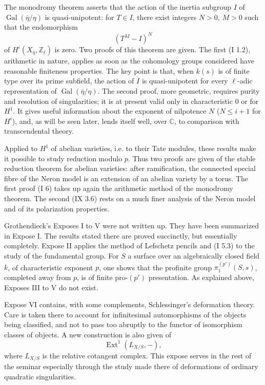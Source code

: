 \documentclass[11pt]{article}
\providecommand{\Gal}{\operatorname{Gal}}
\providecommand{\Zl}{\mathbb Z_\ell}
\begin{document}
The monodromy theorem asserts that the action of the inertia subgroup $I$ of $\Gal(\bar\eta/\eta)$ is quasi-unipotent: for $T\in I$, there exist integers $N>0$, $M>0$ such that the endomorphism
\[
 (T^M-I)^N
\]
of $H^i(X_{\bar\eta},\Zl)$ is zero. Two proofs of this theorem are given. The first (I 1.2), arithmetic in nature, applies as soon as the cohomology groups considered have reasonable finiteness properties. The key point is that, when $k(s)$ is of finite type over its prime subfield, the action of $I$ is quasi-unipotent for every $\ell$-adic representation of $\Gal(\bar\eta/\eta)$. The second proof, more geometric, requires purity and resolution of singularities; it is at present valid only in characteristic $0$ or for $H^1$. It gives useful information about the exponent of nilpotence $N$ ($N\leq i+1$ for $H^i$), and, as will be seen later, lends itself well, over $\mathbb C$, to comparison with transcendental theory.

Applied to $H^1$ of abelian varieties, i.e. to their Tate modules, these results make it possible to study reduction modulo $p$. Thus two proofs are given of the stable reduction theorem for abelian varieties: after ramification, the connected special fibre of the Neron model is an extension of an abelian variety by a torus. The first proof (I 6) takes up again the arithmetic method of the monodromy theorem. The second (IX 3.6) rests on a much finer analysis of the Neron model and of its polarization properties.

Grothendieck's Exposes I to V were not written up. They have been summarized in Expose I. The results stated there are proved succinctly, but essentially completely. Expose II applies the method of Lefschetz pencils and (I 5.3) to the study of the fundamental group. For $S$ a surface over an algebraically closed field $k$, of characteristic exponent $p$, one shows that the profinite group $\pi_1^{(p')}(S,s)$, completed away from $p$, is of finite pro-$(p')$ presentation. As explained above, Exposes III to V do not exist.

Expose VI contains, with some complements, Schlessinger's deformation theory. Care is taken there to account for infinitesimal automorphisms of the objects being classified, and not to pass too abruptly to the functor of isomorphism classes of objects. A new construction is also given of
\[
 \operatorname{Ext}^1(L_{X/S},-),
\]
where $L_{X/S}$ is the relative cotangent complex. This expose serves in the rest of the seminar especially through the study made there of deformations of ordinary quadratic singularities.
\end{document}
